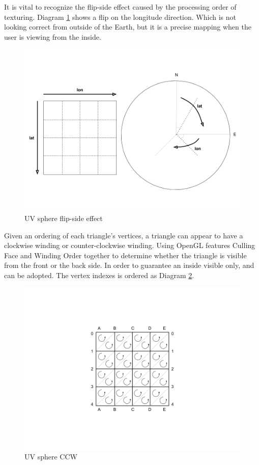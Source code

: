 It is vital to recognize the flip-side effect caused by the processing order of texturing. Diagram \ref{fig:uv-sphere-flip-side} shows a flip on the longitude direction. Which is not looking correct from outside of the Earth, but it is a precise mapping when the user is viewing from the inside.
 
\begin{figure}[H]
\caption{UV sphere flip-side effect}
\label{fig:uv-sphere-flip-side}
\centering
\includegraphics[width=\textwidth, keepaspectratio]{Figures/uv-sphere-flip-side.png}
\decoRule
\end{figure}

Given an ordering of each triangle's vertices, a triangle can appear to have a clockwise winding or counter-clockwise winding. Using OpenGL features Culling Face and Winding Order together to determine whether the triangle is visible from the front or the back side. In order to guarantee an inside visible only,  and  can be adopted. The vertex indexes is ordered as Diagram \ref{fig:uv-sphere-ccw}.

\begin{figure}[H]
\caption{UV sphere CCW}
\label{fig:uv-sphere-ccw}
\centering
\includegraphics[width=\textwidth, keepaspectratio]{Figures/uv-sphere-ccw.png}
\decoRule
\end{figure}

